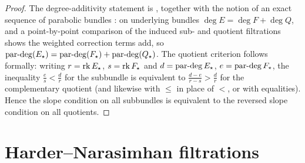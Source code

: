 \begin{proof}
  The degree-additivity statement is \cite[Part 3, \S1.A, p.~69, Remark
  3]{seshadri:fibres-vectoriels-sur-les-courbes-algebriques}, together with the
  notion of an exact sequence of parabolic bundles \cite[Part 3, \S1.A,
  p.~68]{seshadri:fibres-vectoriels-sur-les-courbes-algebriques}: on underlying
  bundles $\deg E = \deg F + \deg Q$, and a point-by-point comparison of the
  induced sub- and quotient filtrations shows the weighted correction terms add,
  so $\operatorname{par\text{-}deg}(E_\star) = \operatorname{par\text{-}deg}(F_\star) + \operatorname{par\text{-}deg}(Q_\star)$.
  The quotient criterion follows formally: writing $r = \operatorname{rk} E_\star$,
  $s = \operatorname{rk} F_\star$ and $d = \operatorname{par\text{-}deg} E_\star$, $e = \operatorname{par\text{-}deg} F_\star$, the
  inequality $\tfrac{e}{s} < \tfrac{d}{r}$ for the subbundle is equivalent to
  $\tfrac{d-e}{r-s} > \tfrac{d}{r}$ for the complementary quotient (and likewise
  with $\leq$ in place of $<$, or with equalities). Hence the slope condition on
  all subbundles is equivalent to the reversed slope condition on all quotients.
\end{proof}

\section{Harder--Narasimhan filtrations}
\label{sec:harder-narasimhan-parabolic}

